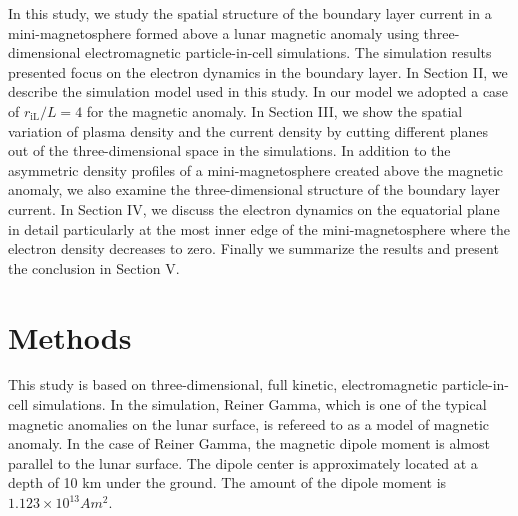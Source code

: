 \documentclass[draft,jgrga]{agutex2015}
\begin{document}
\begin{article}
In this study,
we study the spatial structure of the boundary layer current 
in a mini-magnetosphere formed above a lunar magnetic anomaly
using  three-dimensional electromagnetic particle-in-cell simulations.
The simulation results presented focus on the electron dynamics in the boundary layer.
In Section II, we describe the simulation model used in this study.
In our model we adopted a case of $r_\mathrm{iL} /L=4$ for the magnetic anomaly.
In Section III, we show the spatial variation of plasma density and the current density
by cutting different planes out of the three-dimensional space in the simulations.
In addition to the asymmetric density profiles of a mini-magnetosphere created above
the magnetic anomaly, 
we also examine the three-dimensional structure of the boundary layer current.
In Section IV, we discuss the electron dynamics on the equatorial plane in detail
particularly at the most inner edge of the mini-magnetosphere 
where the electron density decreases to zero.
Finally we summarize the results and present the conclusion in Section V.


\section{Methods}
This study is based on three-dimensional, full kinetic,
electromagnetic particle-in-cell simulations.
In the simulation, Reiner Gamma, 
which is one of the typical magnetic anomalies on the lunar surface, 
is refereed to as a model of magnetic anomaly. 
In the case of Reiner Gamma, 
the magnetic dipole moment is almost parallel to the lunar surface. 
The dipole center is approximately located at a depth of 10 km under the ground. 
The amount of the dipole moment is $1.123 \times 10^{13} Am^2$.


\end{article}
\end{document}
